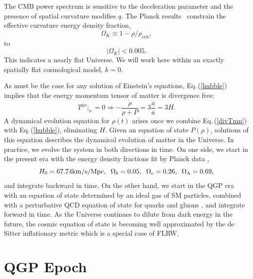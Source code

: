 \documentclass[universe,article,submit,moreauthors,pdftex,a4paper]{Definitions/mdpi}
\newcommand{\beqn}{\begin{equation}}
\newcommand{\eeqn}{\end{equation}}
\newcommand{\req}[1]{Eq.\,(\ref{#1})}
\begin{document}
 The CMB power spectrum is sensitive to the  deceleration parameter  and the presence of spatial curvature modifies $q$. The Planck results~\cite{Planck:2013pxb,Planck:2015fie,Planck:2018vyg} constrain  the effective curvature energy density fraction,
\begin{equation}
\Omega_K\equiv1-\rho/\rho_{\text{crit}},
\end{equation}
to
\begin{equation}
|\Omega_K|<0.005.
\end{equation}
This indicates a nearly flat Universe. We will work here within an exactly spatially flat cosmological model, $k=0$.  


As must be the case for any solution of Einstein's equations,   \req{hubble} implies that the energy momentum tensor of matter is divergence free:
\beqn\label{divTmn}
T^{\mu\nu};_\nu =0 \Rightarrow -\frac{\dot\rho}{\rho+P}=3\frac{\dot a}{a}=3H.
\eeqn
A dynamical evolution equation for $\rho(t)$ arises once we combine \req{divTmn} with \req{hubble},  eliminating $H$.   Given an equation of state $P(\rho)$, solutions of this equation describes the dynamical evolution of matter in the Universe. In practice, we evolve the system in both directions in time.  On one side, we start in the present era with the energy density fractions fit by Planck data \cite{Planck:2013pxb},
\begin{equation}\label{Planck_params}
H_0=67.74\text{km/s/Mpc},\hspace{2mm} \Omega_b=0.05,\hspace{2mm} \Omega_c=0.26, \hspace{2mm}\Omega_\Lambda=0.69,
\end{equation}
 and integrate backward in time.  On the other hand, we start in the QGP era with an equation of state determined by an ideal gas of SM particles, combined with a perturbative QCD equation of state for quarks and gluons \cite{Borsanyi:2013bia}, and integrate forward in time. As the Universe continues to dilute from dark energy in the future, the cosmic equation of state is becoming well approximated by the de Sitter inflationary metric which is a special case of FLRW.

\section{QGP Epoch}\label{sec:QGP}
\end{document}
